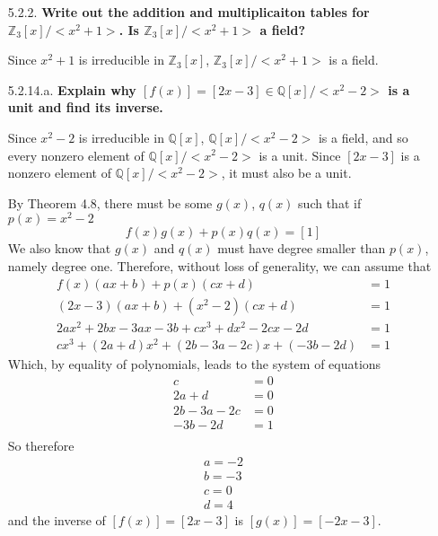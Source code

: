 \documentclass{article}
\begin{document}
\begin{enumerate}
		\item [5.2.2. ] \textbf{Write out the addition and multiplicaiton tables for 
			$\mathbb{Z}_3[x]/<x^2 + 1>$. Is $\mathbb{Z}_3[x]/<x^2 + 1>$ a field?}

			Since $x^2 + 1$ is irreducible in $\mathbb{Z}_3[x]$, $\mathbb{Z}_3[x]/<x^2 + 1>$ is a 
			field.

			\newpage

		\item [5.2.14.a. ] \textbf{Explain why $[f(x)] = [2x - 3] \in \mathbb{Q}[x]/<x^2 - 2>$ is a
			unit and find its inverse.}

			Since $x^2 - 2$ is irreducible in $\mathbb{Q}[x]$, $\mathbb{Q}[x]/<x^2 - 2>$ is a field,
			and so every nonzero element of $\mathbb{Q}[x]/<x^2 - 2>$ is a unit. Since $[2x - 3]$ is
			a nonzero element of $\mathbb{Q}[x]/<x^2 - 2>$, it must also be a unit. 

			By Theorem 4.8, there must be some $g(x)$, $q(x)$ such that if $p(x) = x^2 - 2$ 
			\begin{equation*}
				f(x)g(x) + p(x)q(x) = [1]
			\end{equation*}
			We also know that $g(x)$ and $q(x)$ must have degree smaller than $p(x)$, namely degree
			one. Therefore, without loss of generality, we can assume that
			\begin{align*}
				f(x)(ax + b) + p(x)(cx + d) & = 1 \\
				(2x - 3)(ax + b) + (x^2 - 2)(cx + d) & = 1 \\
				2ax^2 + 2bx - 3ax - 3b + cx^3 + dx^2 - 2cx - 2d & = 1 \\
				cx^3 + (2a + d)x^2 + (2b - 3a - 2c)x + (-3b - 2d) & = 1
			\end{align*}
			Which, by equality of polynomials, leads to the system of equations
			\begin{align*}
				c & = 0 \\
				2a + d & = 0 \\
				2b - 3a - 2c & = 0 \\
				-3b - 2d & = 1 \\
			\end{align*}
			So therefore
			\begin{align*}
				a = -2 \\
				b = -3 \\
				c = 0 \\ 
				d = 4 
			\end{align*}
			and the inverse of $[f(x)] = [2x - 3]$ is $[g(x)] = [-2x -3]$.


\end{enumerate}
\end{document}
